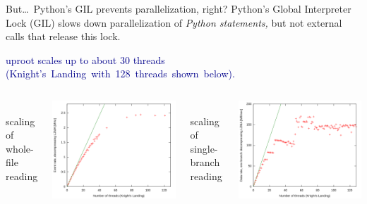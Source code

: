 \documentclass[aspectratio=169]{beamer}
\begin{document}
\begin{frame}{But\ldots\ Python's GIL prevents parallelization, right?}
\vspace{0.4 cm}
{\large Python's Global Interpreter Lock (GIL) slows down parallelization of {\it Python statements,} but not external calls that release this lock.}

\vspace{0.35 cm}
\textcolor{darkblue}{uproot scales up to about 30 threads \mbox{(Knight's Landing with 128 threads shown below).\hspace{-1 cm}}}

\vspace{0.35 cm}
\begin{columns}
\mbox{ } \hfill scaling of whole-file reading \hfill \mbox{ }

\vspace{0.2 cm}
\includegraphics[width=\linewidth]{uproot-scaling.png}

\mbox{ } \hfill scaling of single-branch reading \hfill \mbox{ }

\vspace{0.2 cm}
\includegraphics[width=\linewidth]{uproot-scaling-2.png}
\end{columns}
\end{frame}
\end{document}
